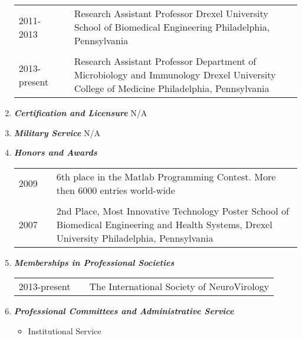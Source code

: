 \documentclass[a4paper,11pt]{article}
\begin{document}
\begin{enumerate}
\begin{longtable}{p{}p{}p{}}
  \\
  2011-2013 & & Research Assistant Professor \newline Drexel University \newline School of Biomedical Engineering \newline Philadelphia, Pennsylvania\\
  \\
  2013-present & & Research Assistant Professor \newline Department of Microbiology and Immunology \newline Drexel University College of Medicine \newline Philadelphia, Pennsylvania\\
 \end{longtable}
 \item {\LARGE \itshape \bfseries Certification and Licensure} \newline
 N/A
 \item {\LARGE \itshape \bfseries Military Service} \newline
 N/A
 \item {\LARGE \itshape \bfseries Honors and Awards}
 \begin{longtable}{p{}p{}p{}}
  2009 & & 6th place in the Matlab Programming Contest. \newline More then 6000 entries world-wide\\
  \\
  2007 & & 2nd Place, Most Innovative Technology Poster \newline School of Biomedical Engineering and Health Systems, Drexel University \newline Philadelphia, Pennsylvania\\
  \end{longtable}
 \item {\LARGE \itshape \bfseries Memberships in Professional Societies}
  \begin{longtable}{p{}p{}p{}}
  2013-present & & The International Society of NeuroVirology\\
  \end{longtable}
 \item {\LARGE \itshape \bfseries Professional Committees and Administrative Service}
 \begin{itemize}
  \item[] Institutional Service
  \begin{longtable}{p{}p{}p{}}

\end{longtable}
\end{itemize}
\end{enumerate}
\end{document}
